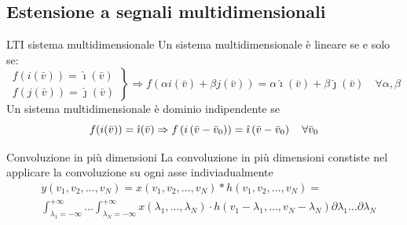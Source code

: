 \subsection{Estensione a segnali multidimensionali}
\begin{definizione}{LTI sistema multidimensionale}
	Un sistema multidimensionale è lineare se e solo se:
	\[
		\left.\begin{array}{c}
			f(i(\bar{v}))=\hat{\imath}(\bar{v}) \\
			f(j(\bar{v}))=\hat{\jmath}(\bar{v})
		\end{array}\right\}
		\Rightarrow f(\alpha i(\bar{v})+\beta j(\bar{v}))=\alpha \hat{\imath}(\bar{v})+\beta \hat{\jmath}(\bar{v}) \quad \forall \alpha, \beta
	\]
	Un sistema multidimensionale è dominio indipendente se
	\[
		f(i(\bar{v}))=\hat{\imath}(\bar{v}) \Rightarrow f\left(i\left(\bar{v}-\bar{v}_0\right)\right)=\hat{\imath}\left(\bar{v}-\bar{v}_0\right) \quad \forall \bar{v}_0 \\
	\]
\end{definizione}

\begin{definizione}{Convoluzione in più dimensioni}
	La convoluzione in più dimensioni constiste nel applicare la convoluzione su ogni asse indiviadualmente
	\begin{align*}
		 & y\left(v_1, v_2, \ldots, v_N\right)=x\left(v_1, v_2, \ldots, v_N\right) * h\left(v_1, v_2, \ldots, v_N\right)=                                                                                                                \\
		 & \int_{\lambda_1=-\infty}^{+\infty} \ldots \int_{\lambda_N=-\infty}^{+\infty} x\left(\lambda_1, \ldots, \lambda_N\right) \cdot h\left(v_1-\lambda_1, \ldots, v_N-\lambda_N\right) \partial \lambda_1 \ldots \partial \lambda_N
	\end{align*}
\end{definizione}

